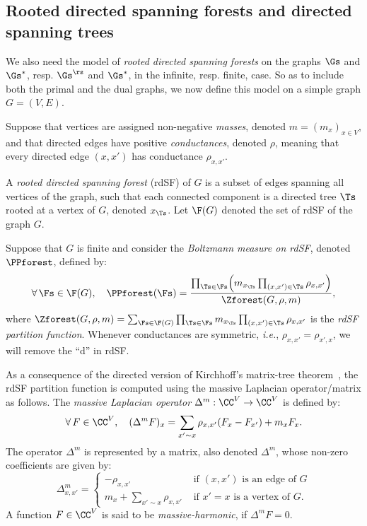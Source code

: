 \documentclass[a4paper,twoside,11pt]{article}
\begin{document}
\subsection{Rooted directed spanning forests and directed spanning trees}\label{sec:spanning_forests}

We also need the model of \emph{rooted directed spanning forests} on the graphs $\Gs$ and $\Gs^*$, resp. $\Gs^\rs$ and $\Gs^*$,
in the infinite, resp. finite, case. So as to include both the primal and the dual graphs, we now define this model on a simple graph 
$G=(V,E)$.

Suppose that vertices are assigned non-negative \emph{masses}, denoted $m=(m_{x})_{x\in V}$, and that directed
edges have positive \emph{conductances}, denoted $\rho$, meaning that every directed edge $(x,x')$
has conductance $\rho_{x,x'}$. 

A \emph{rooted directed spanning forest} (rdSF) of $G$ is a subset of edges spanning all vertices of the graph, 
such that each connected component is a directed tree $\Ts$ rooted at a vertex of $G$, denoted $x_\Ts$. Let 
$\F(G)$ denoted the set of rdSF of the graph $G$. 

Suppose that $G$ is finite and consider the \emph{Boltzmann measure on rdSF}, denoted $\PPforest$, defined by:
\begin{equation*}
\forall\,\Fs\in\F(G),\quad \PPforest(\Fs)=
\frac{\prod_{\Ts\in\Fs}\Bigl(m_{x_\Ts} \prod_{(x,x')\in\Ts}\rho_{x,x'}\Bigr)}{\Zforest(G,\rho,m)},
\end{equation*}
where $\Zforest(G,\rho,m)=\sum_{\Fs\in \F(G)} \prod_{\Ts\in\Fs}m_{x_\Ts} \prod_{(x,x')\in\Ts}\rho_{x,x'}$ 
is the \emph{rdSF partition function}. Whenever conductances are symmetric, \emph{i.e.}, $\rho_{x,x'}=\rho_{x',x}$, we will remove 
the ``d'' in rdSF. 

As a consequence of the directed version of Kirchhoff's matrix-tree theorem~\cite{Kirchhoff,Tutte}, the rdSF partition function is computed 
using the massive Laplacian operator/matrix as follows.
The \emph{massive 
Laplacian operator} $\Delta^m:\CC^V\rightarrow\CC^V$ is defined by:
\begin{equation*}
\forall\, F\in\CC^V,\quad (\Delta^m F)_x=\sum_{x'\sim x} \rho_{x,x'}(F_x-F_{x'}) + m_x F_x.
\end{equation*}
The operator $\Delta^m$ is represented by a matrix, also denoted $\Delta^m$, whose non-zero coefficients are given by:
\begin{equation*}
\Delta^m_{x,x'}=
\begin{cases}
-\rho_{x,x'}& \text{ if $(x,x')$ is an edge of $G$}\\ 
m_x+\sum_{x'\sim x} \rho_{x,x'} & \text{ if $x'=x$ is a vertex of $G$}.
\end{cases}
\end{equation*}
A function $F\in\CC^V$ is said to be \emph{massive-harmonic}, if $\Delta^m F=0$.
\end{document}

